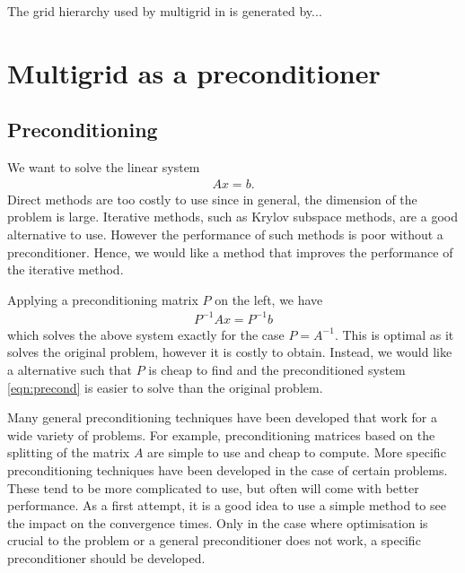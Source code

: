 The grid hierarchy used by multigrid in \oomph is generated by... 



\begin{figure}
	\caption{}
\end{figure}






\section{Multigrid as a preconditioner}

\subsection{Preconditioning}
We want to solve the linear system
\begin{align}
	A x = b.
\end{align}
Direct methods are too costly to use since in general, the dimension of the problem is large.
Iterative methods, such as Krylov subspace methods, are a good alternative to use.
However the performance of such methods is poor without a preconditioner.
Hence, we would like a method that improves the performance of the iterative method.


Applying a preconditioning matrix $P$ on the left, we have
\begin{align}
	P^{-1} A x = P^{-1} b \label{eqn:precond}
\end{align}
which solves the above system exactly for the case $P=A^{-1}$. 
This is optimal as it solves the original problem, however it is costly to obtain.
Instead, we would like a alternative such that $P$ is cheap to find and the preconditioned system \eqref{eqn:precond} is easier to solve than the original problem.


Many general preconditioning techniques have been developed that work for a wide variety of problems.
For example, preconditioning matrices based on the splitting of the matrix $A$ are simple to use and cheap to compute.
More specific preconditioning techniques have been developed in the case of certain problems.
These tend to be more complicated to use, but often will come with better performance.
As a first attempt, it is a good idea to use a simple method to see the impact on the convergence times.
Only in the case where optimisation is crucial to the problem or a general preconditioner does not work, a specific preconditioner should be developed.



